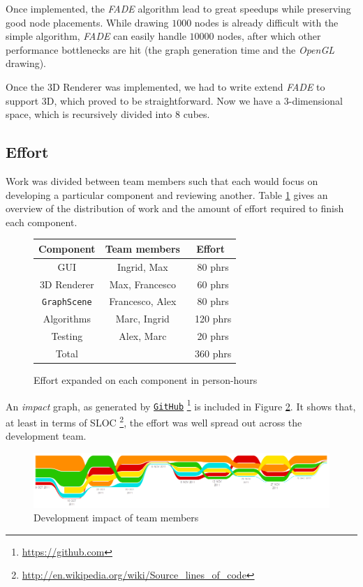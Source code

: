 \documentclass[a4paper,11pt,titlepage]{article}
\let\stdhref\href
\renewcommand{\href}[2]{\stdhref{#1}{\texttt{#2}}}
\newcommand{\code}[1]{\texttt{#1}}
\newcommand{\buzz}[1]{\emph{#1}}
\newcommand{\OpenGL}{\buzz{OpenGL} }
\newcommand{\FADE}{\buzz{FADE} }
\newcommand{\GitHub}{\href{https://github.com}{GitHub} }
\begin{document}
Once implemented, the \FADE algorithm lead to great speedups while
preserving good node placements. While drawing $1000$ nodes is already
difficult with the simple algorithm, \FADE can easily handle $10000$
nodes, after which other performance bottlenecks are hit (the graph
generation time and the \OpenGL drawing).

Once the 3D Renderer was implemented, we had to write extend \FADE to
support 3D, which proved to be straightforward. Now we have a
$3$-dimensional space, which is recursively divided into $8$ cubes.

\subsection{Effort}

Work was divided between team members such that each would focus on
developing a particular component and reviewing another. Table
\ref{fig:effort} gives an overview of the distribution of work and the
amount of effort required to finish each component.

\begin{figure}[h]
  \centering
  \begin{tabular}{c|c|c}
    Component         & Team members    & Effort \\
    \hline
    GUI               & Ingrid, Max     & ~80 phrs \\
    3D Renderer       & Max, Francesco  & ~60 phrs\\
    \code{GraphScene} & Francesco, Alex & ~80 phrs\\
    Algorithms        & Marc, Ingrid    & ~120 phrs\\
    Testing           & Alex, Marc      & ~20 phrs\\
    \hline
    Total             &                 & ~360 phrs
  \end{tabular}
  \caption{Effort expanded on each component in person-hours}
  \label{fig:effort}
\end{figure}

An \emph{impact} graph, as generated by
\GitHub \footnote{\url{https://github.com}} is included in Figure
\ref{fig:impact}. It shows that, at least in terms of
SLOC \footnote{\url{http://en.wikipedia.org/wiki/Source_lines_of_code}},
the effort was well spread out across the development team.

\begin{figure}[h]
  \centering
  \includegraphics[width=\textwidth]{impact.png}
  \caption{Development impact of team members}
  \label{fig:impact}
\end{figure}
\end{document}
